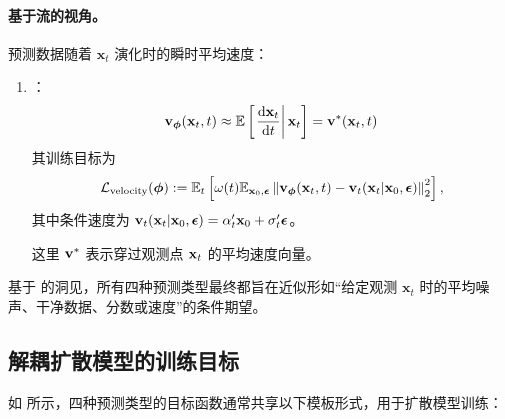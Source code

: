 \paragraph{基于流的视角。} 预测数据随着 $\mathbf{x}_t$ 演化时的瞬时平均速度：
\begin{enumerate}
    \item[4.]  \citep{lipman2022flow,liu2022rectified,salimans2021progressive,albergo2023stochastic}：
    \begin{equation}\label{eq:velocity-def}
        \mathbf{v}_{\bm{\phi}}(\mathbf{x}_t, t) \approx \mathbb{E}\left[\left. \frac{\mathop{}\!\mathrm{d}  \mathbf{x}_t}{\mathop{}\!\mathrm{d}  t} \right| {\mathbf{x}_t}\right] ={\mathbf{v}}^*({\mathbf{x}}_t, t)
    \end{equation}
    其训练目标为
    \[
        \mathcal{L}_{\text{velocity}}(\bm{\phi}) := \mathbb{E}_t \left[\omega(t) \mathbb{E}_{\mathbf{x}_0, \bm{\epsilon}} \left\| \mathbf{v}_{\bm{\phi}}(\mathbf{x}_t,t) - {\mathbf{v}}_t({\mathbf{x}}_t | {\mathbf{x}}_0,\bm{\epsilon}) \right\|_2^2 \right],
    \]
    其中条件速度为 ${\mathbf{v}}_t({\mathbf{x}}_t|{\mathbf{x}}_0,\bm{\epsilon}) = \alpha_t' \mathbf{x}_0 + \sigma_t' \bm{\epsilon}$。

    这里 ${\mathbf{v}}^*$ 表示穿过观测点 ${\mathbf{x}}_t$ 的平均速度向量。
\end{enumerate}


基于  的洞见，所有四种预测类型最终都旨在近似形如“给定观测 $\mathbf{x}_t$ 时的平均噪声、干净数据、分数或速度”的条件期望。









\subsection{解耦扩散模型的训练目标}\label{subsec:summary-disentagle}
如  所示，四种预测类型的目标函数通常共享以下模板形式，用于扩散模型训练：

